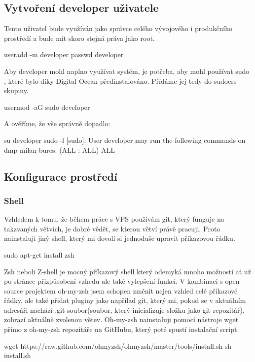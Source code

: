 \documentclass[12pt,a4paper]{report}
\begin{document}
  \subsection{Vytvoření developer uživatele}
  Tento uživatel bude využíván jako správce celého vývojového i produkčního prostředí a bude mít skoro stejná
  práva jako root. \\
  \begin{bash}
    useradd -m developer
    passwd developer
  \end{bash}
  Aby developer mohl naplno využívat systém, je potřeba, aby mohl používat sudo , které bylo díky
  Digital Ocean předinstalováno. Přídáme jej tedy do sudoers skupiny.\\
  \begin{bash}
    usermod -aG sudo developer
  \end{bash}
  \clearpage
  A ověříme, že vše správně dopadlo:\\
  \begin{bash}
   su developer
   sudo -l
   [sudo]:
   User developer may run the following commands on dmp-milan-bures:
   (ALL : ALL) ALL
  \end{bash}


  \subsection{Konfigurace prostředí}
  \subsubsection{Shell}
  Vzhledem k tomu, že během práce s VPS používám git, který funguje na takzvaných větvích, je dobré vědět, se kterou větví právě pracuji.
  Proto nainstaluji jiný shell, který mi dovolí si jednoduše upravit příkazovou řádku.
  \begin{bash}
    sudo apt-get install zsh
  \end{bash}
  Zsh neboli Z-shell je mocný příkazový shell který odemyká mnoho možností ať už po stránce přizpůsobení vzhedu ale také vylepšení funkcí.
  V kombinaci s open-source projektem oh-my-zsh jsem schopen změnit nejen vzhled celé příkazové řádky, ale také přidat pluginy jako napřílad git, který mi, pokud se v aktuálním adresáři nachází .git soubor(soubor, který inicializuje složku jako git repozitář), zobrazí aktuálně zvolenou větev. Oh-my-zsh nainstaluji pomocí nástroje wget přímo z oh-my-zsh repozitáře na GitHubu, který poté spustí instalační script.
  
  \begin{bash}
    wget https://raw.github.com/ohmyzsh/ohmyzsh/master/tools/install.sh
    sh install.sh
  \end{bash}
\end{document}
